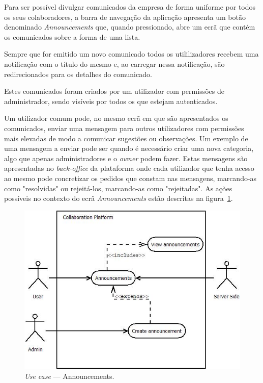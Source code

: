 Para ser possível divulgar comunicados da empresa de forma uniforme por todos os seus colaboradores, a barra de navegação da aplicação apresenta
um botão denominado \textit{Announcements} que, quando pressionado, abre um ecrã que contém os comunicados sobre a forma de uma lista. 
\par
Sempre que for emitido um novo comunicado todos os utililizadores recebem uma notificação com o título do mesmo e, ao carregar nessa notificação, são redirecionados para os detalhes do comunicado. 
\par
Estes comunicados foram criados por um utilizador com permissões de administrador, sendo visíveis por todos os que estejam autenticados.
\par
Um utilizador comum pode, no mesmo ecrã em que são apresentados os comunicados, enviar uma mensagem para outros utilizadores com permissões mais elevadas de modo a comunicar sugestões ou observações. 
Um exemplo de uma mensagem a enviar pode ser quando é necessário criar uma nova categoria, algo que apenas administradores e o \textit{owner} podem fazer.
Estas mensagens são apresentadas no \textit{back-office} da plataforma onde cada utilizador que tenha acesso ao mesmo pode concretizar os pedidos que constam nas mensagens, marcando-as como "resolvidas" ou rejeitá-los, marcando-as como "rejeitadas".
As ações possíveis no contexto do ecrâ \textit{Announcements} estão descritas na figura~\ref{fig:uc:announcements}.

\begin{figure}[H]
    \centering
    \includegraphics[scale=0.6]{figures/Announcements use case.jpeg}
    \caption{\textit{Use case} --- Announcements.}\label{fig:uc:announcements}
\end{figure}

